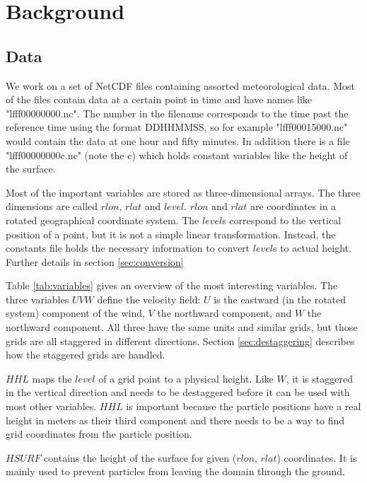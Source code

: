 \setcounter{chapter}{1}

\chapter{Background}

\section{Data}\label{sec:data}
We work on a set of NetCDF files containing assorted meteorological data. Most of the files contain data at a certain point in time and have names like "lfff00000000.nc". The number in the filename corresponds to the time past the reference time using the format DDHHMMSS, so for example "lfff00015000.nc" would contain the data at one hour and fifty minutes. In addition there is a file "lfff00000000c.nc" (note the c) which holds constant variables like the height of the surface.

Most of the important variables are stored as three-dimensional arrays. The three dimensions are called $rlon$, $rlat$ and $level$. $rlon$ and $rlat$ are coordinates in a rotated geographical coordinate system. The $level$s correspond to the vertical position of a point, but it is not a simple linear transformation. Instead, the constants file holds the necessary information to convert $level$s to actual height. Further details in section \ref{sec:conversion}

Table \ref{tab:variables} gives an overview of the most interesting variables. The three variables $UVW$ define the velocity field: $U$ is the eastward (in the rotated system) component of the wind, $V$ the northward component, and $W$ the northward component. All three have the same units and similar grids, but those grids are all staggered in different directions. Section \ref{sec:destaggering} describes how the staggered grids are handled.

$HHL$ maps the $level$ of a grid point to a physical height. Like $W$, it is staggered in the vertical direction and needs to be destaggered before it can be used with most other variables. $HHL$ is important because the particle positions have a real height in meters as their third component and there needs to be a way to find grid coordinates from the particle position.

$HSURF$ contains the height of the surface for given ($rlon$, $rlat$) coordinates. It is mainly used to prevent particles from leaving the domain through the ground.

